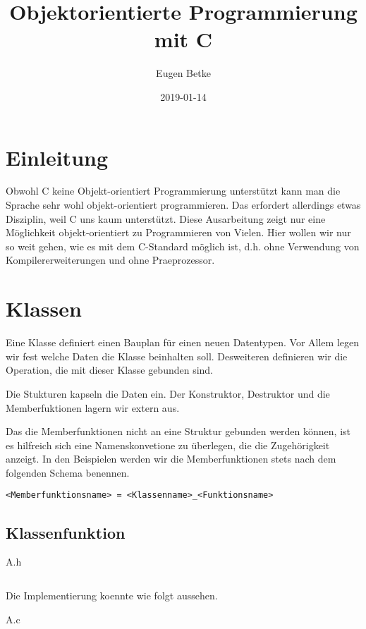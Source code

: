 \documentclass{article}
\title{Objektorientierte Programmierung mit C}
\author{Eugen Betke}
\date{2019-01-14}
\newenvironment{code}{\captionsetup{type=listing}}{}
\begin{document}
\maketitle

\tableofcontents
\section{Einleitung}
Obwohl C keine Objekt-orientiert Programmierung unterstützt kann man die Sprache sehr wohl objekt-orientiert programmieren.
Das erfordert allerdings etwas Disziplin, weil C uns kaum unterstützt.
Diese Ausarbeitung zeigt nur eine Möglichkeit objekt-orientiert zu Programmieren von Vielen.
Hier wollen wir nur so weit gehen, wie es mit dem C-Standard möglich ist, d.h. ohne Verwendung von Kompilererweiterungen und ohne Praeprozessor.


\section{Klassen}
Eine Klasse definiert einen Bauplan für einen neuen Datentypen.
Vor Allem legen wir fest welche Daten die Klasse beinhalten soll.
Desweiteren definieren wir die Operation, die mit dieser Klasse gebunden sind.

Die Stukturen kapseln die Daten ein.
Der Konstruktor, Destruktor und die Memberfuktionen lagern wir extern aus.

Das die Memberfunktionen nicht an eine Struktur gebunden werden können, ist es hilfreich sich eine Namenskonvetione zu überlegen, die die Zugehörigkeit anzeigt. 
In den Beispielen werden wir die Memberfunktionen stets nach dem folgenden Schema benennen.
\begin{lstlisting}
<Memberfunktionsname> = <Klassenname>_<Funktionsname>
\end{lstlisting}

\subsection{Klassenfunktion}
\begin{code}
	\caption{A.h}
	\inputminted{C}{code/employees/employee.h}
\end{code}

Die Implementierung koennte wie folgt aussehen.

\begin{code}
	\caption{A.c}
	\inputminted{C}{code/employees/employee.c}
\end{code}
\end{document}
